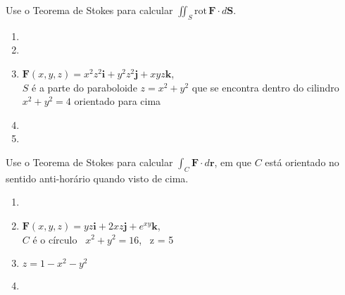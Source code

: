 



	
	
	\vspace{5mm}
	
	Use o Teorema de Stokes para calcular $\displaystyle \iint_S \mathrm{rot} \, \textbf{F} \cdot d\textbf{S}$.
	
	\begin{enumerate}
		
		\item
		\resposta{}

		\item
		\resposta{}

		\item $\textbf{F}(x,y,z) = x^{2}z^{2}\textbf{i} + y^{2}z^{2}\textbf{j} + xyz\textbf{k}$, \\ $S$ é a parte do paraboloide $z = x^2 + y^2$ que se encontra dentro do cilindro $x^2 + y^2 = 4$ orientado para cima
		\resposta{\fazer}

		\item
		\resposta{}

		\item
		\resposta{}

	\end{enumerate}
	
	\vspace{5mm}
	
	Use o Teorema de Stokes para calcular $\displaystyle \int_C \textbf{F} \cdot d\textbf{r}$, em que $C$ está orientado no sentido anti-horário quando visto de cima.
	
	\begin{enumerate}[resume]
	
		\item
		\resposta{}

		\item $\textbf{F}(x,y,z) =  yz\textbf{i} + 2xz\textbf{j} + e^{xy}\textbf{k}$, \\ $C$ é o círculo \, $x^2 + y^2 = 16$, \, z = 5
		\resposta{\fazer}

		\item $z = 1 - x^2 - y^2$
		\resposta{}

		\item
		\resposta{}
	
	\end{enumerate}
		
	\vspace{5mm}	
	
	


